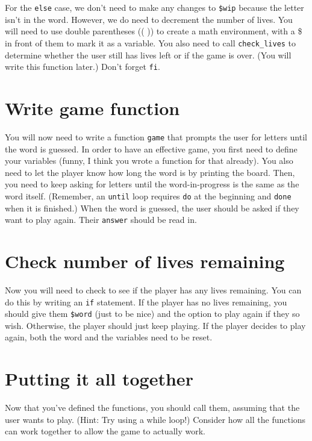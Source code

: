 \documentclass{article}
\begin{document}
For the \verb|else| case, we don't need to make any changes to \verb|$wip| because the letter isn't in the word. However, we do need to decrement the number of lives. You will need to use double parentheses (( )) to create a math environment, with a \$ in front of them to mark it as a variable. You also need to call \verb|check_lives| to determine whether the user still has lives left or if the game is over. (You will write this function later.) Don't forget \verb|fi|.



\section*{Write game function}

\indent\indent You will now need to write a function \verb|game| that prompts the user for letters until the word is guessed. 
In order to have an effective game, you first need to define your variables (funny, I think you wrote a function for that already). 
You also need to let the player know how long the word is by printing the board. 
Then, you need to keep asking for letters until the word-in-progress is the same as the word itself. (Remember, an \verb|until| loop requires \verb|do| at the beginning and \verb|done| when it is finished.)
When the word is guessed, the user should be asked if they want to play again.
Their \verb|answer| should be read in. 



\section*{Check number of lives remaining}

\indent\indent Now you will need to check to see if the player has any lives remaining. You can do this by writing an \verb|if| statement.
If the player has no lives remaining, you should give them \verb|$word| (just to be nice) and the option to play again if they so wish. Otherwise, the player should just keep playing. If the player decides to play again, both the word and the variables need to be reset.



\section*{Putting it all together}

\indent\indent Now that you've defined the functions, you should call them, assuming that the user wants to play. (Hint: Try using a while loop!) Consider how all the functions can work together to allow the game to actually work.
\end{document}
